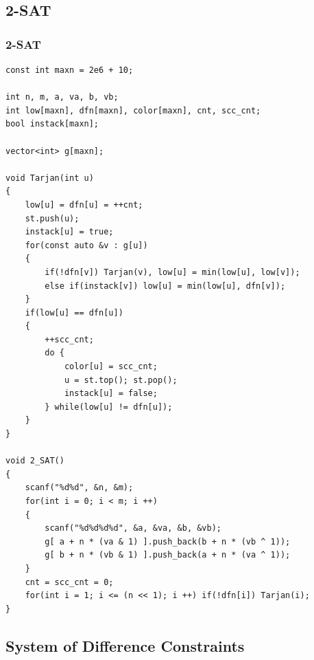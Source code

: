 \documentclass[twoside]{article}
\begin{document}
\subsection{2-SAT}
\subsubsection{2-SAT}
\begin{lstlisting}
const int maxn = 2e6 + 10;

int n, m, a, va, b, vb;
int low[maxn], dfn[maxn], color[maxn], cnt, scc_cnt;
bool instack[maxn];

vector<int> g[maxn];

void Tarjan(int u)
{
    low[u] = dfn[u] = ++cnt;
    st.push(u);
    instack[u] = true;
    for(const auto &v : g[u])
    {
        if(!dfn[v]) Tarjan(v), low[u] = min(low[u], low[v]);
        else if(instack[v]) low[u] = min(low[u], dfn[v]);
    }
    if(low[u] == dfn[u])
    {
        ++scc_cnt;
        do {
            color[u] = scc_cnt;
            u = st.top(); st.pop();
            instack[u] = false;
        } while(low[u] != dfn[u]);
    }
}

void 2_SAT()
{
    scanf("%d%d", &n, &m);
    for(int i = 0; i < m; i ++)
    {
        scanf("%d%d%d%d", &a, &va, &b, &vb);
        g[ a + n * (va & 1) ].push_back(b + n * (vb ^ 1));
        g[ b + n * (vb & 1) ].push_back(a + n * (va ^ 1));
    }
    cnt = scc_cnt = 0;
    for(int i = 1; i <= (n << 1); i ++) if(!dfn[i]) Tarjan(i);
}\end{lstlisting}
\subsection{System of Difference Constraints}
\end{document}
